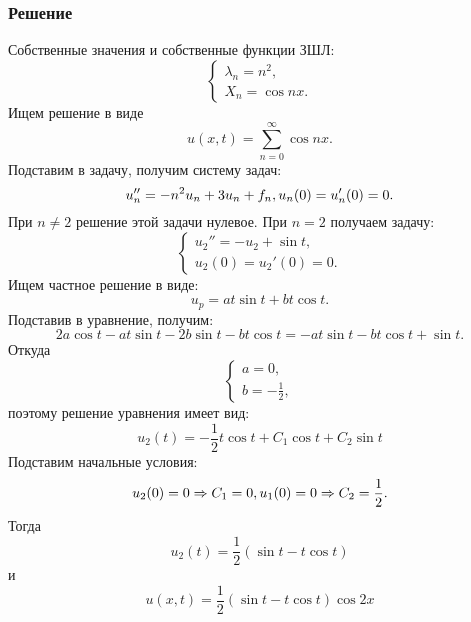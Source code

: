 \documentclass[11pt]{article}
\begin{document}
\subsubsection{Решение}
\label{sec:orgb1a6d76}
Собственные значения и собственные функции ЗШЛ:
\begin{equation}
\begin{cases}
\lambda_n = n^2, \\
X_n = \cos nx.
\end{cases}
\end{equation}
Ищем решение в виде
\begin{equation}
u(x, t) = \sum_{n = 0}^{\infty}\cos nx.
\end{equation}
Подставим в задачу, получим систему задач:
\begin{equation}
u''_n = -n^2u_n + 3u_n + f_n, \\
u_n(0) = u'_n(0) = 0.
\end{equation}
При $n \neq 2$ решение этой задачи нулевое. При $n = 2$ получаем задачу:
\begin{equation}
\begin{cases}
u_2'' = -u_2 + \sin t, \\
u_2(0) = u_2'(0) = 0.
\end{cases}
\end{equation}
Ищем частное решение в виде:
\begin{equation}
u_p = at\sin t + bt\cos t.
\end{equation}
Подставив в уравнение, получим:
\begin{equation}
2a\cos t - at\sin t - 2b\sin t - bt\cos t = -at\sin t - bt\cos t + \sin t.
\end{equation}
Откуда
\begin{equation}
\begin{cases}
a = 0, \\
b = -\frac12,
\end{cases}
\end{equation}
поэтому решение уравнения имеет вид:
\begin{equation}
u_2(t) = -\frac12t\cos t + C_1\cos t + C_2\sin t
\end{equation}
Подставим начальные условия:
\begin{equation}
u_2(0) = 0 \Rightarrow C_1 = 0, \\
u_1(0) = 0 \Rightarrow C_2 = \frac12.
\end{equation}
Тогда
\begin{equation}
u_2(t) = \frac12(\sin t - t\cos t)
\end{equation}
и
\begin{equation}
u(x, t) = \frac12(\sin t - t\cos t)\cos2x
\end{equation}
\end{document}
